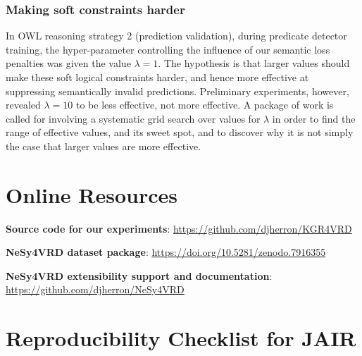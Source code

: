 \documentclass[]{jair}
\begin{document}
\subsubsection{Making soft constraints harder}
In OWL reasoning strategy 2 (prediction validation), during predicate detector training, the hyper-parameter controlling the influence of our semantic loss penalties was given the value $\lambda=1$.
The hypothesis is that larger values should make these soft logical constraints harder, and hence more effective at suppressing semantically invalid predictions.
Preliminary experiments, however, revealed $\lambda=10$ to be less effective, not more effective.
A package of work is called for involving a systematic grid search over values for $\lambda$ in order to find the range of effective values, and its sweet spot, and to discover why it is not simply the case that larger values are more effective.








\printbibliography


\appendix


\section{Online Resources}

\noindent
\textbf{Source code for our experiments}: \url{https://github.com/djherron/KGR4VRD}

\noindent
\textbf{NeSy4VRD dataset package}: \url{https://doi.org/10.5281/zenodo.7916355}

\noindent
\textbf{NeSy4VRD extensibility support and documentation}: \url{https://github.com/djherron/NeSy4VRD}



\section{Reproducibility Checklist for JAIR}
\end{document}
